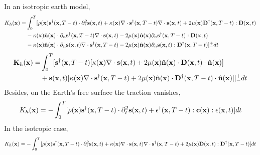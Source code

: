 In an isotropic earth model,
\begin{align*}
  K_h(\mathbf{x})= & \int_0^T[\rho(\mathbf{x})\mathbf{s}^\dagger(\mathbf{x},T-t)\cdot\partial_t^2\mathbf{s}(\mathbf{x},t)+\kappa(\mathbf{x})\nabla\cdot\mathbf{s}^\dagger(\mathbf{x},T-t)\nabla\cdot\mathbf{s}(\mathbf{x},t)+2\mu(\mathbf{x})\mathbf{D}^\dagger(\mathbf{x},T-t):\mathbf{D}(\mathbf{x},t) \\
    & -\kappa(\mathbf{x})\hat{\mathbf{n}}(\mathbf{x})\cdot\partial_n\mathbf{s}^\dagger(\mathbf{x},T-t)\nabla\cdot\mathbf{s}(\mathbf{x},t)-2\mu(\mathbf{x})\hat{\mathbf{n}}(\mathbf{x})\partial_n\mathbf{s}^\dagger(\mathbf{x},T-t):\mathbf{D}(\mathbf{x},t) \\
	& -\kappa(\mathbf{x})\hat{\mathbf{n}}(\mathbf{x})\cdot\partial_n\mathbf{s}(\mathbf{x},t)\nabla\cdot\mathbf{s}^\dagger(\mathbf{x},T-t)-2\mu(\mathbf{x})\hat{\mathbf{n}}(\mathbf{x})\partial_n\mathbf{s}(\mathbf{x},t):\mathbf{D}^\dagger(\mathbf{x},T-t)]_-^+dt
\end{align*}
\begin{align*}
  \mathbf{K}_h(\mathbf{x})= & \int_0^T[\mathbf{s}^\dagger(\mathbf{x},T-t)[\kappa(\mathbf{x})\nabla\cdot\mathbf{s}(\mathbf{x},t)+2\mu(\mathbf{x})\hat{\mathbf{n}}(\mathbf{x})\cdot\mathbf{D}(\mathbf{x},t)\cdot\hat{\mathbf{n}}(\mathbf{x})] \\
    & +\mathbf{s}(\mathbf{x},t)[\kappa(\mathbf{x})\nabla\cdot\mathbf{s}^\dagger(\mathbf{x},T-t)+2\mu(\mathbf{x})\hat{\mathbf{n}}(\mathbf{x})\cdot\mathbf{D}^\dagger(\mathbf{x},T-t)\cdot\hat{\mathbf{n}}(\mathbf{x})]]_-^+dt
\end{align*}
Besides, on the Earth's free surface the traction vanishes,
\[ K_h(\mathbf{x})=-\int_0^T[\rho(\mathbf{x})\mathbf{s}^\dagger(\mathbf{x},T-t)\cdot\partial_t^2\mathbf{s}(\mathbf{x},t)+\mathbf{\epsilon}^\dagger(\mathbf{x},T-t):\mathbf{c}(\mathbf{x}):\mathbf{\epsilon}(\mathbf{x},t)]dt \]
In the isotropic case,
\[ K_h(\mathbf{x})=-\int_0^T[\rho(\mathbf{x})\mathbf{s}^\dagger(\mathbf{x},T-t)\cdot\partial_t^2\mathbf{s}(\mathbf{x},t)+\kappa(\mathbf{x})\nabla\cdot\mathbf{s}(\mathbf{x},t)\nabla\cdot\mathbf{s}^\dagger(\mathbf{x},T-t)+2\mu(\mathbf{x})\mathbf{D}(\mathbf{x},t):\mathbf{D}^\dagger(\mathbf{x},T-t)]dt \]

